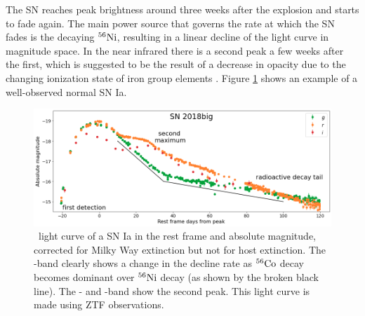 \documentclass[a4paper,oneside,12pt, class=Latex/Classes/PhDthesisPSnPDF, crop=false]{standalone}
\begin{document}
The SN reaches peak brightness around three weeks after the explosion and starts to fade again. The main power source that governs the rate at which the SN fades is the decaying $^{56}\text{Ni}$, resulting in a linear decline of the light curve in magnitude space. In the near infrared there is a second peak a few weeks after the first, which is suggested to be the result of a decrease in opacity due to the changing ionization state of iron group elements \citep{2nd_max}. Figure \ref{Ia-norm_example} shows an example of a well-observed normal SN Ia.

\begin{figure}
    \centering
    \includegraphics[width=\textwidth]{../Images/chapter_1/Ia-norm_example.png}
    \caption{\ztfg\ztfr\ztfi\ light curve of a SN Ia in the rest frame and absolute magnitude, corrected for Milky Way extinction but not for host extinction. The \ztfg-band clearly shows a change in the decline rate as $^{56}\text{Co}$ decay becomes dominant over $^{56}\text{Ni}$ decay (as shown by the broken black line). The \ztfr- and \ztfi-band show the second peak. This light curve is made using ZTF observations.}
    \label{Ia-norm_example}
\end{figure}
\end{document}
